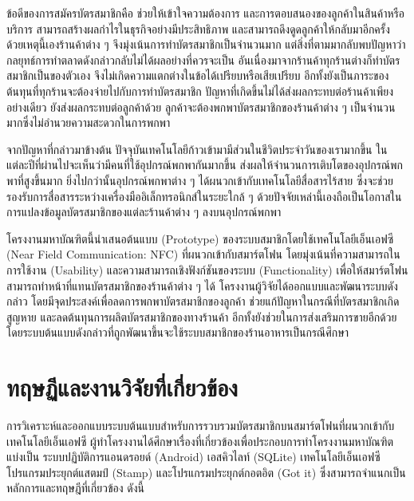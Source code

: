 \documentclass[12pt,a4paper,twocolumn]{article}
\begin{document}
ข้อดีของการสมัครบัตรสมาชิกคือ ช่วยให้เข้าใจความต้องการ และการตอบสนองของลูกค้าในสินค้าหรือบริการ สามารถสร้างผลกําไรในธุรกิจอย่างมีประสิทธิภาพ และสามารถดึงดูดลูกค้าให้กลับมาอีกครั้ง ด้วยเหตุนี้เองร้านค้าต่าง ๆ จึงมุ่งเน้นการทำบัตรสมาชิกเป็นจำนวนมาก แต่สิ่งที่ตามมากลับพบปัญหาว่ากลยุทธ์การทำตลาดดังกล่าวกลับไม่ได้ผลอย่างที่ควรจะเป็น อันเนื่องมาจากร้านค้าทุกร้านต่างก็ทำบัตรสมาชิกเป็นของตัวเอง จึงไม่เกิดความแตกต่างในข้อได้เปรียบหรือเสียเปรียบ อีกทั้งยังเป็นภาระของต้นทุนที่ทุกร้านจะต้องจ่ายไปกับการทำบัตรสมาชิก ปัญหาที่เกิดขึ้นไม่ได้ส่งผลกระทบต่อร้านค้าเพียงอย่างเดียว  ยังส่งผลกระทบต่อลูกค้าด้วย ลูกค้าจะต้องพกพาบัตรสมาชิกของร้านค้าต่าง ๆ เป็นจำนวนมากซึ่งไม่อำนวยความสะดวกในการพกพา

จากปัญหาที่กล่าวมาข้างต้น ปัจจุบันเทคโนโลยีก้าวเข้ามามีส่วนในชีวิตประจำวันของเรามากขึ้น ในแต่ละปีที่ผ่านไปจะเห็นว่ามีคนที่ใช้อุปกรณ์พกพากันมากขึ้น ส่งผลให้จำนวนการเติบโตของอุปกรณ์พกพาที่สูงขึ้นมาก \cite{itm:shopping} ยิ่งไปกว่านั้นอุปกรณ์พกพาต่าง ๆ ได้ผนวกเข้ากับเทคโนโลยีสื่อสารไร้สาย ซึ่งจะช่วยรองรับการสื่อสารระหว่างเครื่องมืออิเล็กทรอนิกส์ในระยะใกล้ ๆ \cite{itm:rpp-mobile} ด้วยปัจจัยเหล่านี้เองถือเป็นโอกาสในการแปลงข้อมูลบัตรสมาชิกของแต่ละร้านค้าต่าง ๆ ลงบนอุปกรณ์พกพา 

โครงงานมหาบัณฑิตนี้นำเสนอต้นแบบ (Prototype) ของระบบสมาชิกโดยใช้เทคโนโลยีเอ็นเอฟซี (Near Field Communication: NFC) ที่ผนวกเข้ากับสมาร์ตโฟน โดยมุ่งเน้นที่ความสามารถในการใช้งาน (Usability) และความสามารถเชิงฟังก์ชันของระบบ (Functionality) เพื่อให้สมาร์ตโฟนสามารถทำหน้าที่แทนบัตรสมาชิกของร้านค้าต่าง ๆ ได้ โครงงานผู้วิจัยได้ออกแบบและพัฒนาระบบดังกล่าว โดยมีจุดประสงค์เพื่อลดการพกพาบัตรสมาชิกของลูกค้า ช่วยแก้ปัญหาในกรณีที่บัตรสมาชิกเกิดสูญหาย และลดต้นทุนการผลิตบัตรสมาชิกของทางร้านค้า อีกทั้งยังช่วยในการส่งเสริมการขายอีกด้วย โดยระบบต้นแบบดังกล่าวที่ถูกพัฒนาขึ้นจะใช้ระบบสมาชิกของร้านอาหารเป็นกรณีศึกษา


\section{ทฤษฏีและงานวิจัยที่เกี่ยวข้อง}
การวิเคราะห์และออกแบบระบบต้นแบบสำหรับการรวบรวมบัตรสมาชิกบนสมาร์ตโฟนที่ผนวกเข้ากับเทคโนโลยีเอ็นเอฟซี ผู้ทำโครงงานได้ศึกษาเรื่องที่เกี่ยวข้องเพื่อประกอบการทําโครงงานมหาบัณฑิต แบ่งเป็น ระบบปฏิบัติการแอนดรอยด์ (Android) เอสคิวไลท์ (SQLite) เทคโนโลยีเอ็นเอฟซี โปรแกรมประยุกต์แสตมป์ (Stamp) และโปรแกรมประยุกต์กอตอิต (Got it) ซึ่งสามารถจําแนกเป็นหลักการและทฤษฎีที่เกี่ยวข้อง ดังนี้
\end{document}
